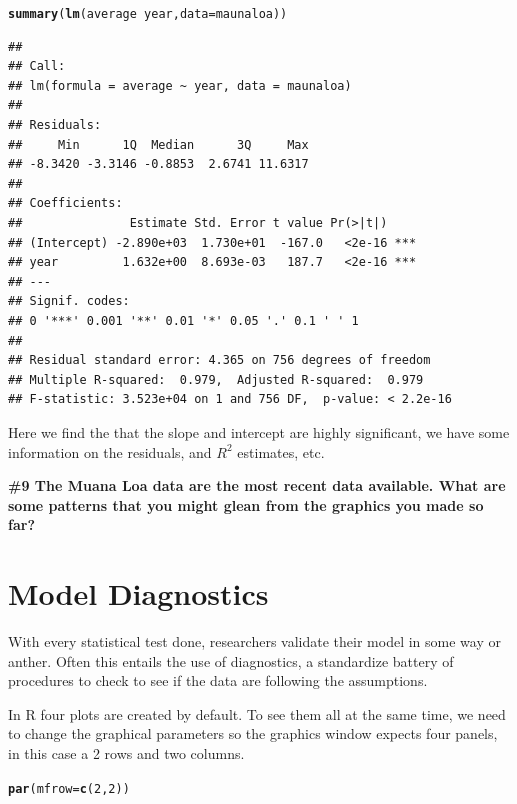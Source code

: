 \documentclass{tufte-handout}\usepackage[]{graphicx}\usepackage[]{color}
\makeatletter
\newcommand{\hlnum}[1]{\textcolor[rgb]{0.686,0.059,0.569}{#1}}%
\newcommand{\hlopt}[1]{\textcolor[rgb]{0,0,0}{#1}}%
\newcommand{\hlstd}[1]{\textcolor[rgb]{0.345,0.345,0.345}{#1}}%
\newcommand{\hlkwc}[1]{\textcolor[rgb]{0.333,0.667,0.333}{#1}}%
\newcommand{\hlkwd}[1]{\textcolor[rgb]{0.737,0.353,0.396}{\textbf{#1}}}%
\newenvironment{kframe}{%
 \def\at@end@of@kframe{}%
 \ifinner\ifhmode%
  \def\at@end@of@kframe{\end{minipage}}%
  \begin{minipage}{\columnwidth}%
 \fi\fi%
 \def\FrameCommand##1{\hskip\@totalleftmargin \hskip-\fboxsep
 \colorbox{shadecolor}{##1}\hskip-\fboxsep
     \hskip-\linewidth \hskip-\@totalleftmargin \hskip\columnwidth}%
 \MakeFramed {\advance\hsize-\width
   \@totalleftmargin\z@ \linewidth\hsize
   \@setminipage}}%
 {\par\unskip\endMakeFramed%
 \at@end@of@kframe}
\newenvironment{knitrout}{}{} %
\makeatother
\begin{document}
\begin{knitrout}
\color{fgcolor}\begin{kframe}
\begin{alltt}
\hlkwd{summary}\hlstd{(}\hlkwd{lm}\hlstd{(average} \hlopt{~} \hlstd{year,} \hlkwc{data}\hlstd{=maunaloa))}
\end{alltt}
\begin{verbatim}
## 
## Call:
## lm(formula = average ~ year, data = maunaloa)
## 
## Residuals:
##     Min      1Q  Median      3Q     Max 
## -8.3420 -3.3146 -0.8853  2.6741 11.6317 
## 
## Coefficients:
##               Estimate Std. Error t value Pr(>|t|)    
## (Intercept) -2.890e+03  1.730e+01  -167.0   <2e-16 ***
## year         1.632e+00  8.693e-03   187.7   <2e-16 ***
## ---
## Signif. codes:  
## 0 '***' 0.001 '**' 0.01 '*' 0.05 '.' 0.1 ' ' 1
## 
## Residual standard error: 4.365 on 756 degrees of freedom
## Multiple R-squared:  0.979,	Adjusted R-squared:  0.979 
## F-statistic: 3.523e+04 on 1 and 756 DF,  p-value: < 2.2e-16
\end{verbatim}
\end{kframe}
\end{knitrout}

Here we find the that the slope and intercept are highly significant, we have some information on the residuals, and $R^2$ estimates, etc.

\bigskip
\noindent  \textbf{\#9 The Muana Loa data are the most recent data available. What are some patterns that you might glean from the graphics you made so far? }

\section{Model Diagnostics}

With every statistical test done, researchers validate their model in some way or anther. Often this entails the use of diagnostics, a standardize battery of procedures to check to see if the data are following the assumptions. 

In R four plots are created by default.  To see them all at the same time, we need to change the graphical parameters so the graphics window expects four panels, in this case a 2 rows and two columns. 

\begin{knitrout}
\color{fgcolor}\begin{kframe}
\begin{alltt}
\hlkwd{par}\hlstd{(}\hlkwc{mfrow}\hlstd{=}\hlkwd{c}\hlstd{(}\hlnum{2}\hlstd{,}\hlnum{2}\hlstd{))}
\end{alltt}
\end{kframe}
\end{knitrout}
\end{document}
